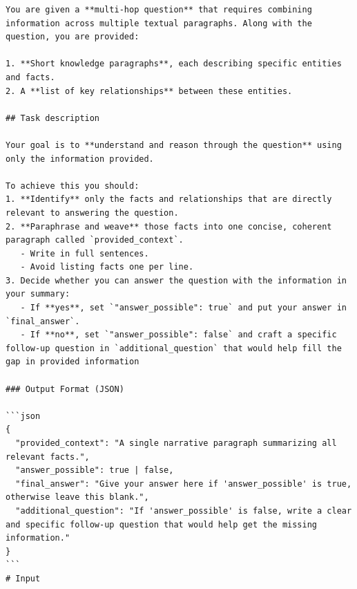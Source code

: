 \documentclass{article}
\begin{document}
\begin{lstlisting}[style=promptstyle, caption={Reasoning prompt for SA-RAG},label={lst:reasoning_sa}]
You are given a **multi-hop question** that requires combining information across multiple textual paragraphs. Along with the question, you are provided:

1. **Short knowledge paragraphs**, each describing specific entities and facts.
2. A **list of key relationships** between these entities.

## Task description

Your goal is to **understand and reason through the question** using only the information provided.

To achieve this you should:
1. **Identify** only the facts and relationships that are directly relevant to answering the question.
2. **Paraphrase and weave** those facts into one concise, coherent paragraph called `provided_context`.
   - Write in full sentences.
   - Avoid listing facts one per line.
3. Decide whether you can answer the question with the information in your summary:
   - If **yes**, set `"answer_possible": true` and put your answer in `final_answer`.
   - If **no**, set `"answer_possible": false` and craft a specific follow-up question in `additional_question` that would help fill the gap in provided information

### Output Format (JSON)

```json
{
  "provided_context": "A single narrative paragraph summarizing all relevant facts.",
  "answer_possible": true | false,
  "final_answer": "Give your answer here if 'answer_possible' is true, otherwise leave this blank.",
  "additional_question": "If 'answer_possible' is false, write a clear and specific follow-up question that would help get the missing information."
}
```
# Input
\end{lstlisting}
\end{document}
